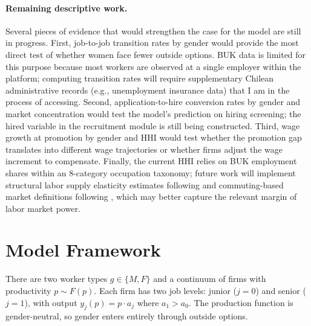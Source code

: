 \documentclass[11pt]{article}
\begin{document}
\paragraph{Remaining descriptive work.} Several pieces of evidence that would strengthen the case for the model are still in progress. First, job-to-job transition rates by gender would provide the most direct test of whether women face fewer outside options. BUK data is limited for this purpose because most workers are observed at a single employer within the platform; computing transition rates will require supplementary Chilean administrative records (e.g., unemployment insurance data) that I am in the process of accessing. Second, application-to-hire conversion rates by gender and market concentration would test the model's prediction on hiring screening; the hired variable in the recruitment module is still being constructed. Third, wage growth at promotion by gender and HHI would test whether the promotion gap translates into different wage trajectories or whether firms adjust the wage increment to compensate. Finally, the current HHI relies on BUK employment shares within an 8-category occupation taxonomy; future work will implement structural labor supply elasticity estimates following \citet{sharma_monopsony_2023} and commuting-based market definitions following \citet{Schubert_Stansbury_Taska_2024}, which may better capture the relevant margin of labor market power.
\section{Model Framework}

There are two worker types $g \in \{M, F\}$ and a continuum of firms with productivity $p \sim F(p)$. Each firm has two job levels: junior ($j=0$) and senior ($j=1$), with output $y_j(p) = p \cdot a_j$ where $a_1 > a_0$. The production function is gender-neutral, so gender enters entirely through outside options.
\end{document}
